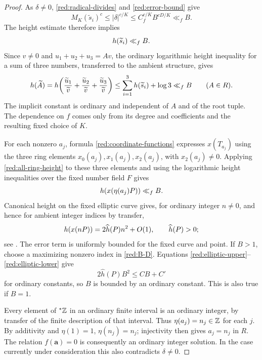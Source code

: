 \begin{proof}
As $\delta\ne0$, \eqref{red:radical-divides} and
\eqref{red:error-bound} give
\[
 M_K(\widetilde s_i)^c
       \le |\delta|^{c/K}
       \le C_f^{c/K}B^{cD/K}\ll_f B.
\]
The height estimate therefore implies
\begin{equation}\label{red:slope-height}
                               h(\widetilde s_i)\ll_f B.
\end{equation}
Since $v\ne0$ and $u_1+u_2+u_3=Av$, the ordinary logarithmic height
inequality for a sum of three numbers, transferred to the ambient
structure, gives
\begin{equation}\label{red:all-ring-height}
 h(\widetilde A)
   =h\!\left(\frac{\widetilde u_1}{\widetilde v}
             +\frac{\widetilde u_2}{\widetilde v}
             +\frac{\widetilde u_3}{\widetilde v}\right)
       \le\sum_{i=1}^3h(\widetilde s_i)+\log3
       \ll_f B \qquad(A\in R).
\end{equation}
The implicit constant is ordinary and independent of $A$ and of the
root tuple. The dependence on $f$ comes only from its degree and
coefficients and the resulting fixed choice of $K$.

For each nonzero \(a_j\), formula
\eqref{red:coordinate-functions} expresses \(x(T_{a_j})\) using
the three ring elements \(x_0(a_j),x_1(a_j),x_2(a_j)\), with
\(x_2(a_j)\ne0\). Applying \eqref{red:all-ring-height} to these
three elements and using the logarithmic height inequalities over the
fixed number field \(F\) gives
\begin{equation}\label{red:elliptic-upper}
                         h(x(\eta(a_j)P))\ll_f B.
\end{equation}
Canonical height on the fixed elliptic curve gives, for ordinary
integer $n\ne0$, and hence for ambient integer indices by transfer,
\begin{equation}\label{red:elliptic-lower}
             h(x(nP))=2\widehat h(P)n^2+O(1),
                         \qquad\widehat h(P)>0;
\end{equation}
see \cite{Silverman2009}. The error term is uniformly bounded for
the fixed curve and point. If $B>1$, choose a maximizing nonzero
index in \eqref{red:B-D}. Equations
\eqref{red:elliptic-upper}--\eqref{red:elliptic-lower} give
\[
                         2\widehat h(P)B^2\le C B+C'
\]
for ordinary constants, so $B$ is bounded by an ordinary constant.
This is also true if $B=1$.

Every element of ${}^*\mathbb Z$ in an ordinary finite interval is an
ordinary integer, by transfer of the finite description of that
interval. Thus $\eta(a_j)=n_j\in\mathbb Z$ for each $j$.
By additivity and $\eta(1)=1$, $\eta(n_j)=n_j$; injectivity then
gives $a_j=n_j$ in $R$. The relation $f(\mathbf a)=0$ is consequently
an ordinary integer solution. In the case currently under consideration
this also contradicts $\delta\ne0$.
\end{proof}

